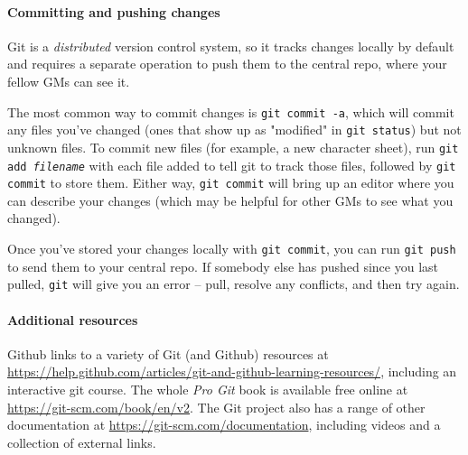\documentclass[green]{testgame}
\begin{document}
\paragraph*{Committing and pushing changes}

Git is a \emph{distributed} version control system, so it tracks changes locally by default and requires a separate operation to push them to the central repo, where your fellow GMs can see it.

The most common way to commit changes is \texttt{git commit -a}, which will commit any files you've changed (ones that show up as "modified" in \texttt{git status}) but not unknown files. To commit new files (for example, a new character sheet), run \texttt{git add \emph{filename}} with each file added to tell git to track those files, followed by \texttt{git commit} to store them. Either way, \texttt{git commit} will bring up an editor where you can describe your changes (which may be helpful for other GMs to see what you changed).

Once you've stored your changes locally with \texttt{git commit}, you can run \texttt{git push} to send them to your central repo. If somebody else has pushed since you last pulled, \texttt{git} will give you an error -- pull, resolve any conflicts, and then try again.

\paragraph*{Additional resources}

Github links to a variety of Git (and Github) resources at \url{https://help.github.com/articles/git-and-github-learning-resources/}, including an interactive git course. The whole \emph{Pro Git} book is available free online at \url{https://git-scm.com/book/en/v2}. The Git project also has a range of other documentation at \url{https://git-scm.com/documentation}, including videos and a collection of external links.
\end{document}
